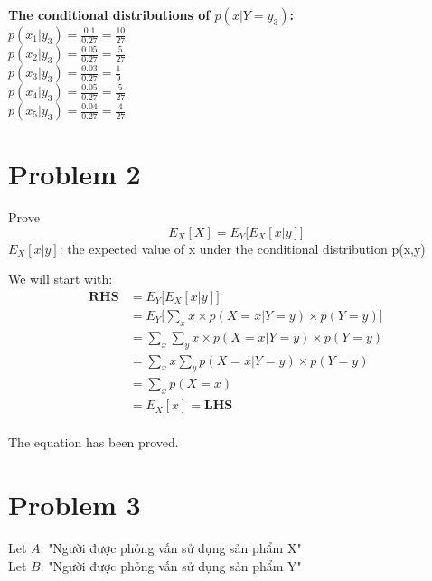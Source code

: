 \documentclass{article}
\begin{document}
\textbf{The conditional distributions of $p(x|Y = y_3)$:} \\

$p(x_1|y_3) = \frac{0.1}{0.27} = \frac{10}{27}$ \\


$p(x_2|y_3) = \frac{0.05}{0.27} = \frac{5}{27}$ \\

$p(x_3|y_3) = \frac{0.03}{0.27} = \frac{1}{9}$ \\

$p(x_4|y_3) = \frac{0.05}{0.27} = \frac{5}{27}$ \\

$p(x_5|y_3) = \frac{0.04}{0.27} = \frac{4}{27}$ \\


\section*{Problem 2}
Prove $$
E_X[X] = E_Y\Bigg[E_X[x|y]\Bigg]
$$
$E_X[x|y]$: the expected value of x under the conditional distribution p(x,y) 

We will start with:
\begin{equation}
    \begin{split}
    \textbf{RHS} & = E_Y\Bigg[E_X[x|y]\Bigg] \\
        & = E_Y \Bigg[\sum_x x \times p(X=x|Y=y)\times p(Y=y) \Bigg] \\
        & = \sum_x\sum_y x \times p(X=x|Y=y) \times p(Y=y) \\
        & = \sum_x x \sum_y p(X=x|Y=y)\times p(Y=y) \\
        & = \sum_x p(X=x)  \\
        & = E_X[x] = \textbf{LHS} \\
    \end{split}
\end{equation}

The equation has been proved.
                


\section*{Problem 3}
Let $A$: "Người được phỏng vấn sử dụng sản phẩm X" \\
Let $B$: "Người được phỏng vấn sử dụng sản phẩm Y" \\
\end{document}
